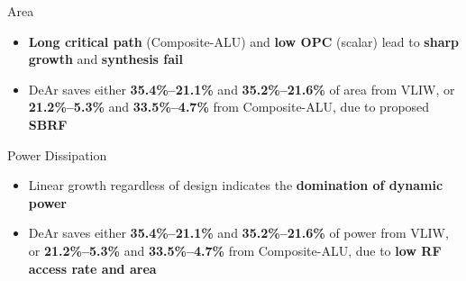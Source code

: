 \documentclass{beamer}
\begin{document}
\begin{CJK}{UTF8}{bkai}
            \begin{frame}{Area}
                \setcounter{subfigure}{0}
                \begin{figure}[t]
                    \begin{center}
                    \end{center}
                \end{figure}
                \begin{itemize}
                    \item <2->{\textbf{Long critical path} (Composite-ALU) and \textbf{low OPC} (scalar) lead to \textbf{sharp growth} and \textbf{synthesis fail}}
                    \item <3->{DeAr saves either \textbf{35.4\%--21.1\%} and \textbf{35.2\%--21.6\%} of area from VLIW, 
                                or \textbf{21.2\%--5.3\%} and \textbf{33.5\%--4.7\%} from Composite-ALU, due to proposed \textbf{SBRF}}
                \end{itemize}
            \end{frame}

            \begin{frame}{Power Dissipation}
                \setcounter{subfigure}{0}
                \begin{figure}[t]
                    \begin{center}
                    \end{center}
                \end{figure}
                \begin{itemize}
                    \item <2->{Linear growth regardless of design indicates the \textbf{domination of dynamic power}}
                    \item <3->{DeAr saves either \textbf{35.4\%--21.1\%} and \textbf{35.2\%--21.6\%} of power from VLIW, 
                                or \textbf{21.2\%--5.3\%} and \textbf{33.5\%--4.7\%} from Composite-ALU, due to \textbf{low RF access rate and area} }
                \end{itemize}
            \end{frame}


\end{CJK}
\end{document}
